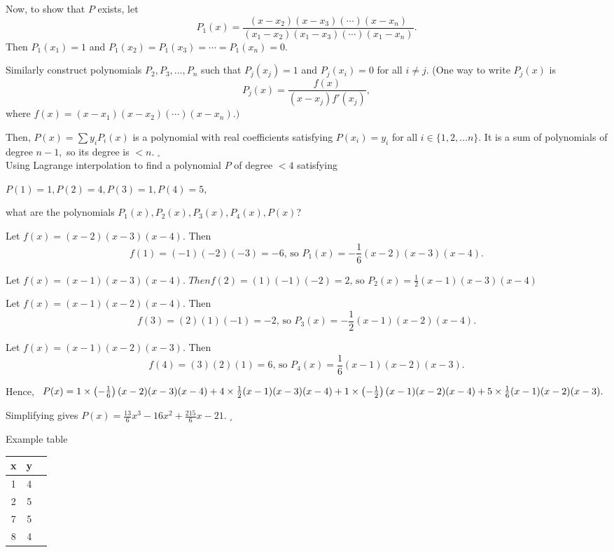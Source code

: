 \documentclass{article}
\begin{document}
Now, to show that \( P\) exists, let \[ P_1(x) = \frac{(x-x_2)(x-x_3)(\cdots)(x-x_n)}{(x_1-x_2)(x_1-x_3)(\cdots)(x_1-x_n)}. \] Then \( P_1(x_1)=1 \) and \( P_1(x_2)=P_1(x_3)=\cdots=P_1(x_n)=0.\)

Similarly construct polynomials \( P_2,P_3,\ldots,P_n\) such that \( P_j (x_j)=1\) and \( P_j (x_i)=0\) for all \( i \neq j\). (One way to write \(P_j(x)\) is \[ P_j(x) = \frac{f(x)}{(x-x_j)f'(x_j)}, \] where \( f(x) = (x-x_1)(x-x_2)(\cdots)(x-x_n).)\)

Then, \( P(x) = \sum y_i P_i(x) \) is a polynomial with real coefficients satisfying \( P(x_i)=y_i\) for all \( i \in \{ 1,2, \ldots n \} \). It is a sum of polynomials of degree \( n-1,\) so its degree is \( <n.\) \(_\square\)\\
Using Lagrange interpolation to find a polynomial \(P\) of degree \( <4\) satisfying

$ P(1)=1, P(2)=4, P(3)=1, P(4)=5,$

what are the polynomials \( P_1(x), P_2(x), P_3(x), P_4(x), P(x)\)?

Let \( f(x) = (x-2)(x-3)(x-4)\). Then \[ f(1) = (-1)(-2)(-3)=-6 \text{, so } P_1(x) = -\frac {1}{6}(x-2)(x-3)(x-4).\]

Let $ f(x) = (x-1)(x-3)(x-4).$ $Then  f(2) = (1)(-1)(-2) = 2 \text{, so } P_2 (x) = \frac {1}{2} (x-1)(x-3)(x-4) $

Let \( f(x) = (x-1)(x-2)(x-4)\). Then \[ f(3) = (2)(1)(-1) = -2 \text{, so } P_3 (x) = -\frac {1}{2} (x-1)(x-2)(x-4). \]

Let \( f(x) = (x-1)(x-2)(x-3)\). Then \[ f(4) = (3)(2)(1) = 6 \text{, so } P_4 (x) = \frac {1}{6} (x-1)(x-2)(x-3). \]

Hence, $\ P(x) = 1\times \left(-\frac {1}{6}\right)(x-2)(x-3)(x-4) + 4\times \frac {1}{2} (x-1)(x-3)(x-4)\\ + 1\times \left(-\frac {1}{2}\right) (x-1)(x-2)(x-4)+ 5 \times \frac {1}{6} (x-1)(x-2)(x-3). $
\newline

Simplifying gives \( P(x) = \frac{13}6 x^3 -16x^2+\frac{215}6 x -21.\) \(_\square\)
\newline

\large{Example table}
\begin{center}

\begin{tabular}{ |c|c|c| } 
\hline
 x & y\\
 \hline
 1 & 4  \\  \hline
 2 & 5  \\  \hline
 7 & 5 \\  \hline
 8 & 4  \\  \hline


 
 \hline
\end{tabular}
\end{center}
\end{document}
